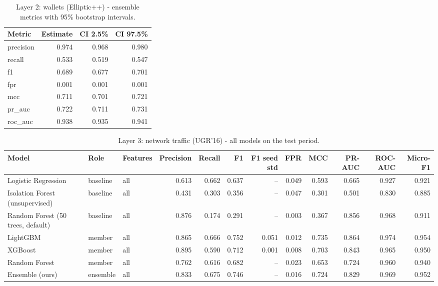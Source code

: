 \begin{table}[t]
\centering
\caption{Layer 2: wallets (Elliptic++) - ensemble metrics with 95\% bootstrap intervals.}
\label{tab:wallet-ci}
\begin{tabular}{lrrr}
\toprule
Metric & Estimate & CI 2.5\% & CI 97.5\% \\
\midrule
precision & 0.974 & 0.968 & 0.980 \\
recall & 0.533 & 0.519 & 0.547 \\
f1 & 0.689 & 0.677 & 0.701 \\
fpr & 0.001 & 0.001 & 0.001 \\
mcc & 0.711 & 0.701 & 0.721 \\
pr\_auc & 0.722 & 0.711 & 0.731 \\
roc\_auc & 0.938 & 0.935 & 0.941 \\
\bottomrule
\end{tabular}
\end{table}

\begin{table}[t]
\centering
\caption{Layer 3: network traffic (UGR'16) - all models on the test period.}
\label{tab:network-models}
\begin{tabular}{lllrrrrrrrrr}
\toprule
Model & Role & Features & Precision & Recall & F1 & F1 seed std & FPR & MCC & PR-AUC & ROC-AUC & Micro-F1 \\
\midrule
Logistic Regression & baseline & all & 0.613 & 0.662 & 0.637 & -- & 0.049 & 0.593 & 0.665 & 0.927 & 0.921 \\
Isolation Forest (unsupervised) & baseline & all & 0.431 & 0.303 & 0.356 & -- & 0.047 & 0.301 & 0.501 & 0.830 & 0.885 \\
Random Forest (50 trees, default) & baseline & all & 0.876 & 0.174 & 0.291 & -- & 0.003 & 0.367 & 0.856 & 0.968 & 0.911 \\
LightGBM & member & all & 0.865 & 0.666 & 0.752 & 0.051 & 0.012 & 0.735 & 0.864 & 0.974 & 0.954 \\
XGBoost & member & all & 0.895 & 0.590 & 0.712 & 0.001 & 0.008 & 0.703 & 0.843 & 0.965 & 0.950 \\
Random Forest & member & all & 0.762 & 0.616 & 0.682 & -- & 0.023 & 0.653 & 0.724 & 0.960 & 0.940 \\
Ensemble (ours) & ensemble & all & 0.833 & 0.675 & 0.746 & -- & 0.016 & 0.724 & 0.829 & 0.969 & 0.952 \\
\bottomrule
\end{tabular}
\end{table}

